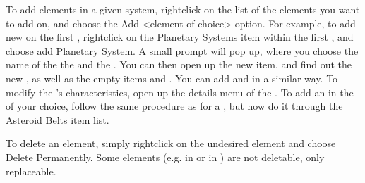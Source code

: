 \documentclass[letterpaper,10pt,english]{sphinxmanual}
\begin{document}
\sphinxAtStartPar
To add elements in a given system, right\sphinxhyphen{}click on the list of the elements you want
to add on, and choose the Add \textless{}element of choice\textgreater{} option. For example, to add new
{\hyperref[\detokenize{celestial_systems/planetary_system:id1}]{}} on the first {\hyperref[\detokenize{celestial_systems/stellar_system:id1}]{}},
right\sphinxhyphen{}click on the Planetary Systems item within the first {\hyperref[\detokenize{celestial_systems/stellar_system:id1}]{}},
and choose add Planetary System. A small prompt
will pop up, where you choose the name of the the {\hyperref[\detokenize{celestial_systems/planetary_system:id1}]{}}
and the {\hyperref[\detokenize{celestial_bodies/planet:id1}]{}}.
You can then open up the new {\hyperref[\detokenize{celestial_systems/planetary_system:id1}]{}} item,
and find out the new {\hyperref[\detokenize{celestial_bodies/planet:id1}]{}}, as
well as the empty items {\hyperref[\detokenize{celestial_bodies/satellite:id1}]{}} and {\hyperref[\detokenize{celestial_bodies/trojan:id1}]{}}.
You can add {\hyperref[\detokenize{celestial_bodies/satellite:id1}]{}} and {\hyperref[\detokenize{celestial_bodies/trojan:id1}]{}} in
a similar way. To modify the {\hyperref[\detokenize{celestial_bodies/planet:id1}]{}}’s characteristics, open up the details menu of the
{\hyperref[\detokenize{celestial_bodies/planet:id1}]{}}. To add an {\hyperref[\detokenize{celestial_bodies/asteroid_belt:id1}]{}} in the
{\hyperref[\detokenize{celestial_systems/stellar_system:id1}]{}} of your choice, follow the same
procedure as for a {\hyperref[\detokenize{celestial_systems/planetary_system:id1}]{}},
but now do it through the Asteroid Belts item list.

\sphinxAtStartPar
To delete an element, simply right\sphinxhyphen{}click on the undesired element and choose
Delete Permanently.
Some elements (e.g. {\hyperref[\detokenize{celestial_bodies/planet:id1}]{}} in {\hyperref[\detokenize{celestial_systems/planetary_system:id1}]{}}
or {\hyperref[\detokenize{celestial_bodies/star:id1}]{}} in {\hyperref[\detokenize{celestial_systems/stellar_system:id1}]{}}) are not deletable, only replaceable.
\end{document}
